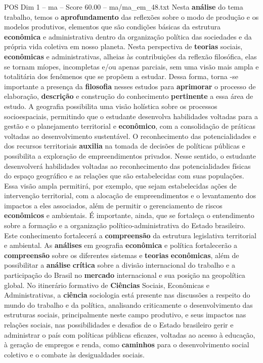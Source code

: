 \begin{textsample}{POS Dim 1 – ma – Score 60.00 – ma/ma\_em\_48.txt}
Nesta \textbf{análise} do tema trabalho, temos o \textbf{aprofundamento} das reflexões sobre o modo de produção e os modelos produtivos, elementos que são condições básicas da estrutura \textbf{econômica} e administrativa dentro da organização política das sociedades e da própria vida coletiva em nosso planeta.
Nesta perspectiva de \textbf{teorias} sociais, \textbf{econômicas} e administrativas, alheias às contribuições da reflexão filosófica, elas se tornam míopes, incompletas e/ou apenas parciais, sem uma visão mais ampla e totalitária dos fenômenos que se propõem a estudar.
Dessa forma, torna -se importante a presença da \textbf{filosofia} nesses estudos para \textbf{aprimorar} o processo de elaboração, \textbf{descrição} e construção do conhecimento \textbf{pertinente} a essa área de estudo.
A geografia possibilita uma visão holística sobre os processos socioespaciais, permitindo que o estudante desenvolva habilidades voltadas para a gestão e o planejamento territorial e \textbf{econômico}, com a consolidação de práticas voltadas ao desenvolvimento sustentável.
O reconhecimento das potencialidades e dos recursos territoriais \textbf{auxilia} na tomada de decisões de políticas públicas e possibilita a exploração de empreendimentos privados.
Nesse sentido, o estudante desenvolverá habilidades voltadas ao reconhecimento das potencialidades físicas do espaço geográfico e as relações que são estabelecidas com suas populações.
Essa visão ampla permitirá, por exemplo, que sejam estabelecidas ações de intervenção territorial, com a alocação de empreendimentos e o levantamento dos impactos a eles associados, além de permitir o gerenciamento de riscos \textbf{econômicos} e ambientais.
É importante, ainda, que se fortaleça o entendimento sobre a formação e a organização político-administrativa do Estado brasileiro.
Este conhecimento fortalecerá a \textbf{compreensão} da estrutura legislativa territorial e ambiental.
As \textbf{análises} em geografia \textbf{econômica} e política fortalecerão a \textbf{compreensão} sobre os diferentes sistemas e \textbf{teorias} \textbf{econômicas}, além de possibilitar a \textbf{análise} \textbf{crítica} sobre a divisão internacional do trabalho e a participação do Brasil no \textbf{mercado} internacional e sua posição na geopolítica global.
No itinerário formativo de \textbf{Ciências} Sociais, Econômicas e Administrativas, a \textbf{ciência} sociologia está presente nas discussões a respeito do mundo do trabalho e da política, analisando criticamente o desenvolvimento das estruturas sociais, principalmente neste campo produtivo, e seus impactos nas relações sociais, nas possibilidades e desafios de o Estado brasileiro gerir e administrar o país com políticas públicas eficazes, voltadas ao acesso à educação, à geração de empregos e renda, como \textbf{caminhos} para o desenvolvimento social coletivo e o combate às desigualdades sociais.

\end{textsample}
